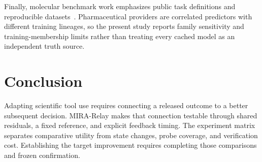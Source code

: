 \documentclass[sigconf,anonymous]{aamas}
\begin{document}
Finally, molecular benchmark work emphasizes public task definitions and reproducible datasets~\cite{huang2021tdc,wu2018moleculenet}. Pharmaceutical providers are correlated predictors with different training lineages, so the present study reports family sensitivity and training-membership limits rather than treating every cached model as an independent truth source.

\section{Conclusion}
Adapting scientific tool use requires connecting a released outcome to a better subsequent decision. MIRA-Relay makes that connection testable through shared residuals, a fixed reference, and explicit feedback timing. The experiment matrix separates comparative utility from state changes, probe coverage, and verification cost. Establishing the target improvement requires completing those comparisons and frozen confirmation.

\balance


\end{document}
